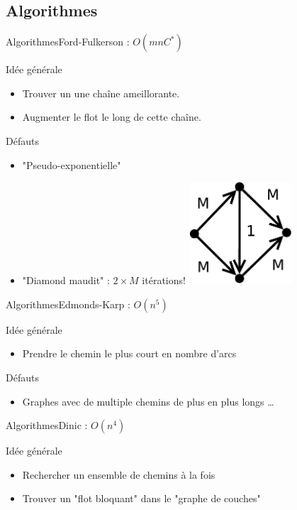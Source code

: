 \subsection{Algorithmes}
\begin{frame}{Algorithmes}{Ford-Fulkerson : $O(mnC^*)$}

\begin{block}{Idée générale}
\begin{itemize}
\item Trouver un une chaîne ameillorante.
\item Augmenter le flot le long de cette chaîne.
\end{itemize}
\end{block}

\begin{block}{Défauts}
\begin{itemize}
\item "Pseudo-exponentielle"
\item "Diamond maudit" : $2\times{M}$ itérations! 
\includegraphics[width=0.3\textwidth]{img/maudit}
\end{itemize}
\end{block}

\end{frame}
\begin{frame}{Algorithmes}{Edmonds-Karp : $O(n^5)$}

\begin{block}{Idée générale}
\begin{itemize}
\item Prendre le chemin le plus court en nombre d'arcs
\end{itemize}
\end{block}

\begin{block}{Défauts}
\begin{itemize}
\item Graphes avec de multiple chemins de plus en plus longs \dots
\end{itemize}
\end{block}

\end{frame}

\begin{frame}{Algorithmes}{Dinic : $O(n^4)$}
\begin{block}{Idée générale}
\begin{itemize}
\item Rechercher un ensemble de chemins à la fois
\item Trouver un "flot bloquant" dans le "graphe de couches"
\end{itemize}
\end{block}
\end{frame}